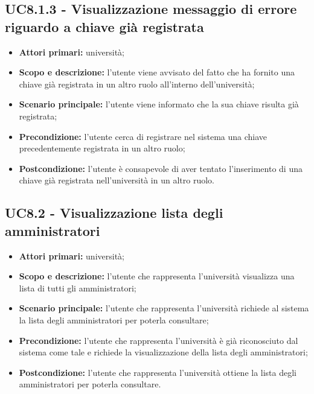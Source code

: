 \documentclass[AnalisiDeiRequisiti.tex]{subfiles}
\begin{document}
\subsection{UC8.1.3 - Visualizzazione messaggio di errore riguardo a chiave già registrata}
\begin{itemize}
	\item \textbf{Attori primari:} università;
	\item \textbf{Scopo e descrizione:} l'utente viene avvisato del fatto che ha fornito una chiave già registrata in un altro ruolo all'interno dell'università;
	\item \textbf{Scenario principale:} l'utente viene informato che la sua chiave risulta già registrata;
	\item \textbf{Precondizione:} l'utente cerca di registrare nel sistema una chiave precedentemente registrata in un altro ruolo;
	\item \textbf{Postcondizione:} l'utente è consapevole di aver tentato l'inserimento di una chiave già registrata nell'università in un altro ruolo.
\end{itemize}


\subsection{UC8.2 - Visualizzazione lista degli amministratori}
	\begin{itemize}
	\item \textbf{Attori primari:} università;
	\item \textbf{Scopo e descrizione:} l'utente che rappresenta l'università visualizza una lista di tutti gli amministratori;
	\item \textbf{Scenario principale:} l'utente che rappresenta l'università richiede al sistema la lista degli amministratori per poterla consultare;
	\item \textbf{Precondizione:} l'utente che rappresenta l'università è già riconosciuto dal sistema come tale e richiede la visualizzazione della lista degli amministratori;
	\item \textbf{Postcondizione:} l'utente che rappresenta l'università ottiene la lista degli amministratori per poterla consultare.
	\end{itemize}
\end{document}
